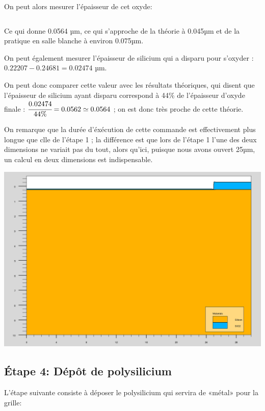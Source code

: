 \documentclass{article}
\begin{document}
On peut alors mesurer l’épaisseur de cet oxyde:
\inputminted[linenos,firstnumber=43,firstline=43,lastline=47]{sh}{final_named.in}

Ce qui donne 0.0564 µm, ce qui s’approche de la théorie à 0.045µm et de la pratique en salle blanche à environ 0.075µm.

On peut également mesurer l’épaisseur de silicium qui a disparu pour s’oxyder : $0.22207-0.24681=0.02474$ µm.

On peut donc comparer cette valeur avec les résultats théoriques, qui disent que l’épaisseur de silicium ayant disparu correspond à 44\% de l’épaisseur d’oxyde finale : $\cfrac{0.02474}{44 \%} = 0.0562 \simeq 0.0564$ ; on est donc très proche de cette théorie.

On remarque que la durée d’éxécution de cette commande est effectivement plus longue que clle de l’étape 1 ; la différence est que lors de l’étape 1 l’une des deux dimensions ne variait pas du tout, alors qu’ici, puisque nous avons ouvert 25µm, un calcul en deux dimensions est indispensable.

\includegraphics[width=\linewidth]{3_gate_oxy.png}

\subsection{Étape 4: Dépôt de polysilicium}
L’étape suivante consiste à déposer le polysilicium qui servira de «métal» pour la grille:
\inputminted[linenos,firstnumber=48,firstline=48,lastline=50]{sh}{final_named.in}
\end{document}
